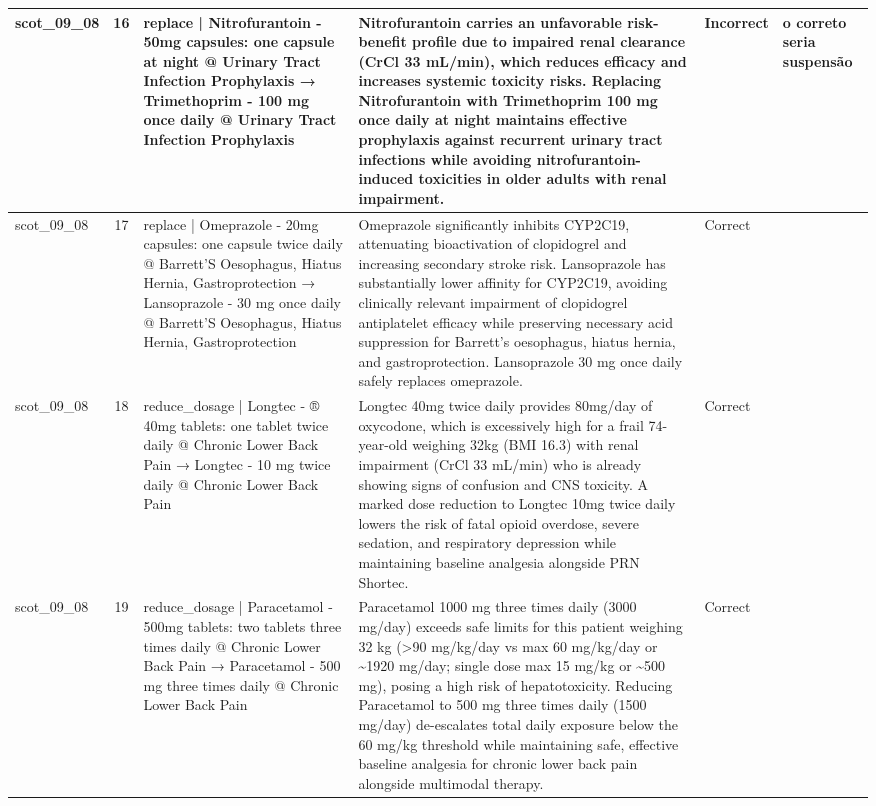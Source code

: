 \begin{longtable}{|p{1.45cm}|c|p{3.3cm}|p{6.5cm}|p{1.55cm}|p{2.3cm}|}
\hline
scot\_09\_08 & 16 & replace | Nitrofurantoin - 50mg capsules: one capsule at night @ Urinary Tract Infection Prophylaxis → Trimethoprim - 100 mg once daily @ Urinary Tract Infection Prophylaxis & Nitrofurantoin carries an unfavorable risk-benefit profile due to impaired renal clearance (CrCl 33 mL/min), which reduces efficacy and increases systemic toxicity risks. Replacing Nitrofurantoin with Trimethoprim 100 mg once daily at night maintains effective prophylaxis against recurrent urinary tract infections while avoiding nitrofurantoin-induced toxicities in older adults with renal impairment. & Incorrect & o correto seria suspensão \\
\hline
scot\_09\_08 & 17 & replace | Omeprazole - 20mg capsules: one capsule twice daily @ Barrett’S Oesophagus, Hiatus Hernia, Gastroprotection → Lansoprazole - 30 mg once daily @ Barrett’S Oesophagus, Hiatus Hernia, Gastroprotection & Omeprazole significantly inhibits CYP2C19, attenuating bioactivation of clopidogrel and increasing secondary stroke risk. Lansoprazole has substantially lower affinity for CYP2C19, avoiding clinically relevant impairment of clopidogrel antiplatelet efficacy while preserving necessary acid suppression for Barrett's oesophagus, hiatus hernia, and gastroprotection. Lansoprazole 30 mg once daily safely replaces omeprazole. & Correct &  \\
\hline
scot\_09\_08 & 18 & reduce\_dosage | Longtec - ® 40mg tablets: one tablet twice daily @ Chronic Lower Back Pain → Longtec - 10 mg twice daily @ Chronic Lower Back Pain & Longtec 40mg twice daily provides 80mg/day of oxycodone, which is excessively high for a frail 74-year-old weighing 32kg (BMI 16.3) with renal impairment (CrCl 33 mL/min) who is already showing signs of confusion and CNS toxicity. A marked dose reduction to Longtec 10mg twice daily lowers the risk of fatal opioid overdose, severe sedation, and respiratory depression while maintaining baseline analgesia alongside PRN Shortec. & Correct &  \\
\hline
scot\_09\_08 & 19 & reduce\_dosage | Paracetamol - 500mg tablets: two tablets three times daily @ Chronic Lower Back Pain → Paracetamol - 500 mg three times daily @ Chronic Lower Back Pain & Paracetamol 1000 mg three times daily (3000 mg/day) exceeds safe limits for this patient weighing 32 kg (>90 mg/kg/day vs max 60 mg/kg/day or \textasciitilde{}1920 mg/day; single dose max 15 mg/kg or \textasciitilde{}500 mg), posing a high risk of hepatotoxicity. Reducing Paracetamol to 500 mg three times daily (1500 mg/day) de-escalates total daily exposure below the 60 mg/kg threshold while maintaining safe, effective baseline analgesia for chronic lower back pain alongside multimodal therapy. & Correct &  \\

\end{longtable}

